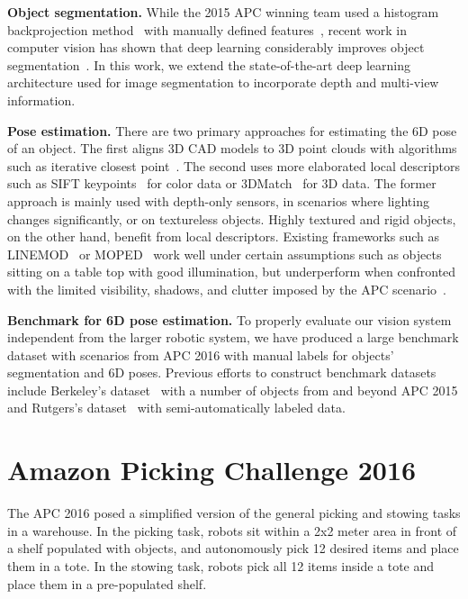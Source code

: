 \documentclass[letterpaper, 10 pt, conference]{ieeeconf}  %
\newcommand{\myparagraph}[1]{\vspace{0.1in}\noindent\textbf{#1}}
\begin{document}
\myparagraph{Object segmentation.}
While the 2015 APC winning team used a histogram backprojection method~\cite{Ming-Yu} with manually defined features~\cite{rbolessons, jonschkowski2016probabilistic}, recent work in computer vision has shown that deep learning considerably improves object segmentation~\cite{long2015fully}.
In this work, we extend the state-of-the-art deep learning architecture used for image segmentation to incorporate depth and multi-view information. 


\myparagraph{Pose estimation.}
There are two primary approaches for estimating the 6D pose of an object. The first aligns 3D CAD models to 3D point clouds
with algorithms such as iterative closest point~\cite{besl1992method}. 
The second uses more elaborated local descriptors such as SIFT keypoints~\cite{SIFT} for color data or 3DMatch~\cite{3dmatch} for 3D data.
The former approach is mainly used with depth-only sensors, in scenarios where lighting changes significantly, or on textureless objects. Highly textured and rigid objects, on the other hand, benefit from local descriptors. 
Existing frameworks such as LINEMOD~\cite{LINEMOD} or MOPED~\cite{collet2011moped} work well under certain assumptions such as objects sitting on a table top with good illumination, but underperform when confronted with the limited visibility, shadows, and clutter imposed by the APC scenario~\cite{Correll2016}.







\myparagraph{Benchmark for 6D pose estimation.}
To properly evaluate our vision system independent from the larger robotic system, we have produced a large benchmark dataset with scenarios from APC 2016 with manual labels for objects' segmentation and 6D poses. Previous efforts to construct benchmark datasets include Berkeley's dataset~\cite{singh2014bigbird} with a number of objects from and beyond APC 2015 and Rutgers's dataset~\cite{rennie2016dataset} with semi-automatically labeled data. 



\section{Amazon Picking Challenge 2016}


The APC 2016 posed a simplified version of the general picking and stowing tasks in a warehouse. In the picking task, robots sit within a 2x2 meter area in front of a shelf populated with objects, and autonomously pick 12 desired items and place them in a tote. In the stowing task, robots pick all 12 items inside a tote and place them in a pre-populated shelf.
\end{document}
